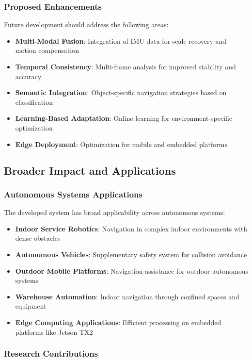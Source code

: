 \documentclass[12pt,oneside]{book}
\begin{document}
\subsubsection{Proposed Enhancements}

Future development should address the following areas:

\begin{itemize}
\item \textbf{Multi-Modal Fusion}: Integration of IMU data for scale recovery and motion compensation
\item \textbf{Temporal Consistency}: Multi-frame analysis for improved stability and accuracy
\item \textbf{Semantic Integration}: Object-specific navigation strategies based on classification
\item \textbf{Learning-Based Adaptation}: Online learning for environment-specific optimization
\item \textbf{Edge Deployment}: Optimization for mobile and embedded platforms
\end{itemize}

\subsection{Broader Impact and Applications}

\subsubsection{Autonomous Systems Applications}

The developed system has broad applicability across autonomous systems:

\begin{itemize}
\item \textbf{Indoor Service Robotics}: Navigation in complex indoor environments with dense obstacles
\item \textbf{Autonomous Vehicles}: Supplementary safety system for collision avoidance
\item \textbf{Outdoor Mobile Platforms}: Navigation assistance for outdoor autonomous systems
\item \textbf{Warehouse Automation}: Indoor navigation through confined spaces and equipment
\item \textbf{Edge Computing Applications}: Efficient processing on embedded platforms like Jetson TX2
\end{itemize}

\subsubsection{Research Contributions}
\end{document}
